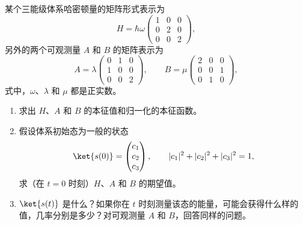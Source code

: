 \begin{question}
某个三能级体系哈密顿量的矩阵形式表示为
\[
H=\hbar\omega\begin{pmatrix}
1&0&0\\
0&2&0\\
0&0&2
\end{pmatrix},
\]
另外的两个可观测量 $A$ 和 $B$ 的矩阵表示为
\[
A=\lambda\begin{pmatrix}
0&1&0\\
1&0&0\\
0&0&2
\end{pmatrix},
\qquad
B=\mu\begin{pmatrix}
2&0&0\\
0&0&1\\
0&1&0
\end{pmatrix},
\]
式中，$\omega$、$\lambda$ 和 $\mu$ 都是正实数。
\begin{enumerate}
\item 求出 $H$、$A$ 和 $B$ 的本征值和归一化的本征函数。
\item 假设体系初始态为一般的状态
\[
\ket{s(0)}=\begin{pmatrix}c_1\\c_2\\c_3\end{pmatrix},
\qquad |c_1|^2+|c_2|^2+|c_3|^2=1,
\]
求（在 $t=0$ 时刻）$H$、$A$ 和 $B$ 的期望值。
\item $\ket{s(t)}$ 是什么？如果你在 $t$ 时刻测量该态的能量，可能会获得什么样的值，几率分别是多少？对可观测量 $A$ 和 $B$，回答同样的问题。
\end{enumerate}
\end{question}
